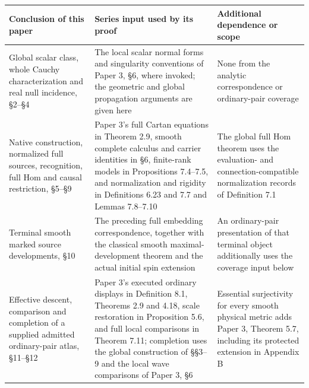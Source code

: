 \documentclass[
  english,
  11pt,
  reqno]{amsart}
\newcounter{none} %
\begin{document}
{\def\LTcaptype{none} %
\begin{longtable}[]{@{}
  >{\raggedright\arraybackslash}p{}
  >{\raggedright\arraybackslash}p{}
  >{\raggedright\arraybackslash}p{}@{}}
\toprule\noalign{}
\begin{minipage}[b]{\linewidth}\raggedright
Conclusion of this paper
\end{minipage} & \begin{minipage}[b]{\linewidth}\raggedright
Series input used by its proof
\end{minipage} & \begin{minipage}[b]{\linewidth}\raggedright
Additional dependence or scope
\end{minipage} \\
\midrule\noalign{}
\endhead
\bottomrule\noalign{}
\endlastfoot
Global scalar class, whole Cauchy characterization and real null
incidence, §2--§4 & The local scalar normal forms and singularity
conventions of Paper 3, §6, where invoked; the geometric and global
propagation arguments are given here & None from the analytic
correspondence or ordinary-pair coverage \\
Native construction, normalized full sources, recognition, full Hom and
causal restriction, §5--§9 & Paper 3's full Cartan equations in Theorem
2.9, smooth complete calculus and carrier identities in §6, finite-rank
models in Propositions 7.4--7.5, and normalization and rigidity in
Definitions 6.23 and 7.7 and Lemmas 7.8--7.10 & The global full Hom
theorem uses the evaluation- and connection-compatible normalization
records of Definition 7.1 \\
Terminal smooth marked source developments, §10 & The preceding full
embedding correspondence, together with the classical smooth
maximal-development theorem and the actual initial spin extension & An
ordinary-pair presentation of that terminal object additionally uses the
coverage input below \\
Effective descent, comparison and completion of a supplied admitted
ordinary-pair atlas, §11--§12 & Paper 3's executed ordinary displays in
Definition 8.1, Theorems 2.9 and 4.18, scale restoration in Proposition
5.6, and full local comparisons in Theorem 7.11; completion uses the
global construction of §§3--9 and the local wave comparisons of Paper 3,
§6 & Essential surjectivity for every smooth physical metric adds Paper
3, Theorem 5.7, including its protected extension in Appendix B \\

\end{longtable}}
\end{document}
